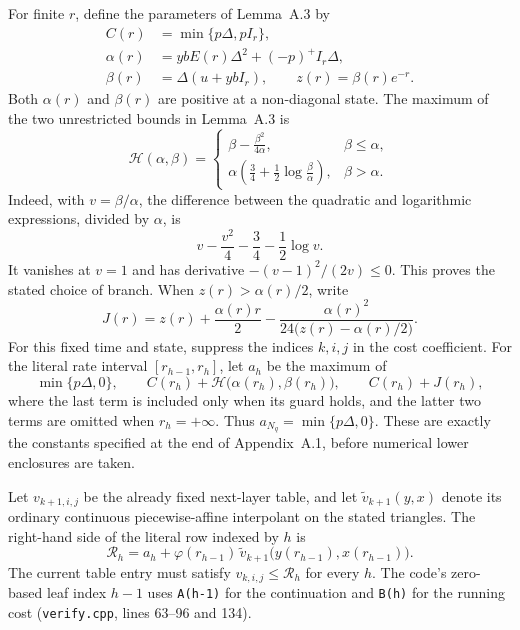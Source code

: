 For finite $r$, define the parameters of Lemma~A.3 by
\begin{align*}
 C(r)&=\min\{p\Delta,pI_r\},\\
 \alpha(r)&=ybE(r)\Delta^2+(-p)^+I_r\Delta,\\
 \beta(r)&=\Delta(u+ybI_r),\qquad z(r)=\beta(r)e^{-r}.
\end{align*}
Both $\alpha(r)$ and $\beta(r)$ are positive at a non-diagonal state.
The maximum of the two unrestricted bounds in Lemma~A.3 is
\begin{equation}
 \mathcal H(\alpha,\beta)=
 \begin{cases}
 \displaystyle \beta-\frac{\beta^2}{4\alpha},&\beta\le\alpha,\\[4pt]
 \displaystyle \alpha\left(\frac34+\frac12\log\frac\beta\alpha\right),
    &\beta>\alpha.
 \end{cases}
 \label{eq:cert-iid-free}
\end{equation}
Indeed, with $v=\beta/\alpha$, the difference between the quadratic and
logarithmic expressions, divided by $\alpha$, is
\[
 v-\frac{v^2}{4}-\frac34-\frac12\log v.
\]
It vanishes at $v=1$ and has derivative $-(v-1)^2/(2v)\le0$.
This proves the stated choice of branch.  When $z(r)>\alpha(r)/2$, write
\[
 J(r)=z(r)+\frac{\alpha(r)r}{2}
       -\frac{\alpha(r)^2}{24\bigl(z(r)-\alpha(r)/2\bigr)}.
\]
For this fixed time and state, suppress the indices $k,i,j$ in the cost coefficient. For the literal rate interval $[r_{h-1},r_h]$, let $a_h$ be the maximum of
\[
 \min\{p\Delta,0\},\qquad
 C(r_h)+\mathcal H\bigl(\alpha(r_h),\beta(r_h)\bigr),\qquad
 C(r_h)+J(r_h),
 \]
where the last term is included only when its guard holds, and the latter
two terms are omitted when $r_h=+\infty$.  Thus
$a_{N_q}=\min\{p\Delta,0\}$.  These are exactly the constants specified at
the end of Appendix~A.1, before numerical lower enclosures are taken.

Let $v_{k+1,i,j}$ be the already fixed next-layer table, and let
$\widetilde v_{k+1}(y,x)$ denote its ordinary continuous piecewise-affine
interpolant on the stated triangles.  The right-hand side of the literal
row indexed by $h$ is
\begin{equation}
 \mathcal R_h
 =a_h+\varphi(r_{h-1})\,
       \widetilde v_{k+1}\bigl(y(r_{h-1}),x(r_{h-1})\bigr).
 \label{eq:cert-iid-row}
\end{equation}
The current table entry must satisfy $v_{k,i,j}\le\mathcal R_h$ for every
$h$.  The code's zero-based leaf index $h-1$ uses \texttt{A(h-1)} for the
continuation and \texttt{B(h)} for the running cost
(\texttt{verify.cpp}, lines 63--96 and 134).

